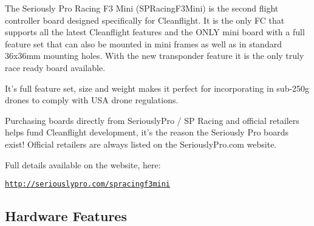 The Seriously Pro Racing F3 Mini (S\+P\+Racing\+F3\+Mini) is the second flight controller board designed specifically for Cleanflight. It is the only F\+C that supports all the latest Cleanflight features and the O\+N\+L\+Y mini board with a full feature set that can also be mounted in mini frames as well as in standard 36x36mm mounting holes. With the new transponder feature it is the only truly race ready board available.

It's full feature set, size and weight makes it perfect for incorporating in sub-\/250g drones to comply with U\+S\+A drone regulations.

Purchasing boards directly from Seriously\+Pro / S\+P Racing and official retailers helps fund Cleanflight development, it's the reason the Seriously Pro boards exist! Official retailers are always listed on the Seriously\+Pro.\+com website.

Full details available on the website, here\+:

\href{http://seriouslypro.com/spracingf3mini}{\tt http\+://seriouslypro.\+com/spracingf3mini}

\subsection*{Hardware Features}


